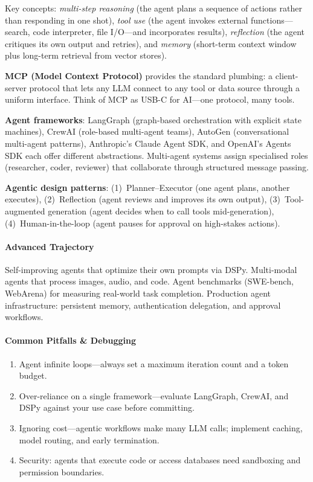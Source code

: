 \documentclass[11pt, a4paper, oneside]{report}
\begin{document}
Key concepts: \emph{multi-step reasoning} (the agent plans a sequence of actions rather than responding in one shot), \emph{tool use} (the agent invokes external functions---search, code interpreter, file I/O---and incorporates results), \emph{reflection} (the agent critiques its own output and retries), and \emph{memory} (short-term context window plus long-term retrieval from vector stores).

\textbf{MCP (Model Context Protocol)} provides the standard plumbing: a client-server protocol that lets any LLM connect to any tool or data source through a uniform interface. Think of MCP as USB-C for AI---one protocol, many tools.

\textbf{Agent frameworks}: LangGraph (graph-based orchestration with explicit state machines), CrewAI (role-based multi-agent teams), AutoGen (conversational multi-agent patterns), Anthropic's Claude Agent SDK, and OpenAI's Agents SDK each offer different abstractions. Multi-agent systems assign specialised roles (researcher, coder, reviewer) that collaborate through structured message passing.

\textbf{Agentic design patterns}: (1)~Planner--Executor (one agent plans, another executes), (2)~Reflection (agent reviews and improves its own output), (3)~Tool-augmented generation (agent decides when to call tools mid-generation), (4)~Human-in-the-loop (agent pauses for approval on high-stakes actions).

\paragraph{Advanced Trajectory} Self-improving agents that optimize their own prompts via DSPy. Multi-modal agents that process images, audio, and code. Agent benchmarks (SWE-bench, WebArena) for measuring real-world task completion. Production agent infrastructure: persistent memory, authentication delegation, and approval workflows.

\paragraph{Common Pitfalls \& Debugging}
\begin{enumerate}[leftmargin=*]
\item Agent infinite loops---always set a maximum iteration count and a token budget.
\item Over-reliance on a single framework---evaluate LangGraph, CrewAI, and DSPy against your use case before committing.
\item Ignoring cost---agentic workflows make many LLM calls; implement caching, model routing, and early termination.
\item Security: agents that execute code or access databases need sandboxing and permission boundaries.
\end{enumerate}
\end{document}
